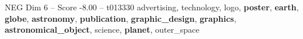 \begin{textsample}{NEG Dim 6 – Score -8.00 – t013330}  \label{ex:f6_neg_025}
advertising, technology, logo, \textbf{poster}, \textbf{earth}, \textbf{globe}, \textbf{astronomy}, \textbf{publication}, \textbf{graphic\_design}, \textbf{graphics}, \textbf{astronomical\_object}, science, \textbf{planet}, outer\_space

\end{textsample}
